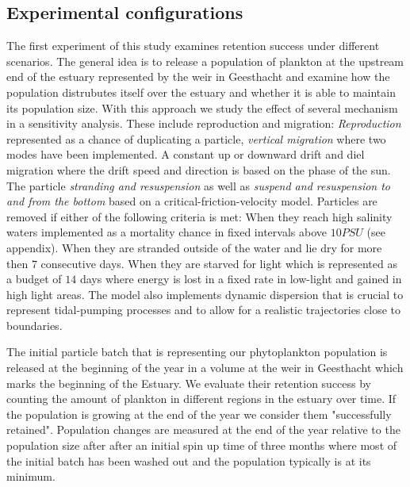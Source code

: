 \subsection*{Experimental configurations}



The first experiment of this study examines retention success under different scenarios.
The general idea is to release a population of plankton at the upstream end of the estuary represented by the weir in Geesthacht
and examine how the population distrubutes itself over the estuary and whether it is able to maintain its population size.
With this approach we study the effect of several mechanism in a sensitivity analysis. These include reproduction and migration:
\textit{Reproduction} represented as a chance of duplicating a particle,
\textit{vertical migration} where two modes have been implemented. 
A constant up or downward drift and diel migration where the drift speed and direction is based on the phase of the sun.
The particle \textit{stranding and resuspension} as well as \textit{suspend and resuspension to and from the bottom}
 based on a critical-friction-velocity model.
Particles are removed if either of the following criteria is met: 
When they reach high salinity waters implemented as a mortality chance in fixed intervals above $10 PSU$ (see appendix).
When they are stranded outside of the water and lie dry for more then $7$ consecutive days.
When they are starved for light which is represented as a budget of $14$ days 
where energy is lost in a fixed rate in low-light and gained in high light areas.
The model also implements dynamic dispersion that is crucial to represent tidal-pumping processes 
and to allow for a realistic trajectories close to boundaries.

The initial particle batch that is representing our phytoplankton population is released at the beginning of the year in a volume at the weir in Geesthacht which marks the beginning of the Estuary.
We evaluate their retention success by counting the amount of plankton in different regions in the estuary over time.
If the population is growing at the end of the year we consider them "successfully retained".
Population changes are measured at the end of the year relative to the population size after after an initial spin up time of three months where most of the initial batch has been washed out and the population typically is at its minimum.


